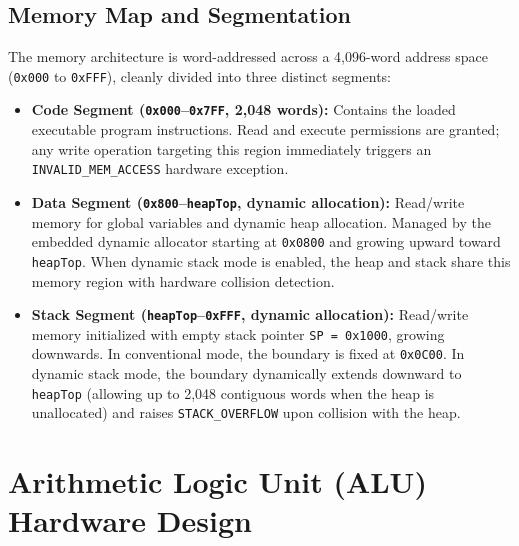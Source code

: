 \documentclass[11pt,a4paper]{article}
\begin{document}
\subsection{Memory Map and Segmentation}
The memory architecture is word-addressed across a 4,096-word address space (\texttt{0x000} to \texttt{0xFFF}), cleanly divided into three distinct segments:
\begin{itemize}
    \item \textbf{Code Segment (\texttt{0x000}--\texttt{0x7FF}, 2,048 words):} Contains the loaded executable program instructions. Read and execute permissions are granted; any write operation targeting this region immediately triggers an \texttt{INVALID\_MEM\_ACCESS} hardware exception.
    \item \textbf{Data Segment (\texttt{0x800}--\texttt{heapTop}, dynamic allocation):} Read/write memory for global variables and dynamic heap allocation. Managed by the embedded dynamic allocator starting at \texttt{0x0800} and growing upward toward \texttt{heapTop}. When dynamic stack mode is enabled, the heap and stack share this memory region with hardware collision detection.
    \item \textbf{Stack Segment (\texttt{heapTop}--\texttt{0xFFF}, dynamic allocation):} Read/write memory initialized with empty stack pointer \texttt{SP = 0x1000}, growing downwards. In conventional mode, the boundary is fixed at \texttt{0x0C00}. In dynamic stack mode, the boundary dynamically extends downward to \texttt{heapTop} (allowing up to 2,048 contiguous words when the heap is unallocated) and raises \texttt{STACK\_OVERFLOW} upon collision with the heap.
\end{itemize}

\section{Arithmetic Logic Unit (ALU) Hardware Design}
\end{document}
